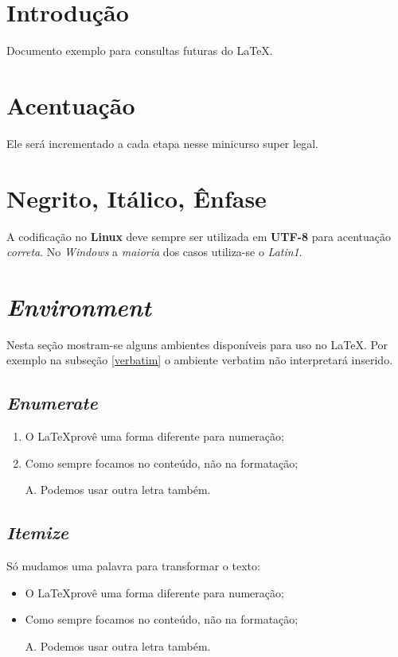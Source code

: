 \documentclass{article}
\begin{document}
	\section{Introdução}
		Documento exemplo para consultas futuras do \LaTeX.

	\section{Acentuação}		
		Ele será incrementado a cada etapa nesse minicurso super legal.
	
	\section{Negrito, Itálico, Ênfase}
		A codificação no \textbf{Linux} deve \huge sempre \normalsize ser utilizada em \textbf{UTF-8} para acentuação \emph{correta}. No \textit{Windows} a \emph{maioria} dos casos utiliza-se o \textit{Latin1}.
		
	\section{\textit{Environment}}
		Nesta seção mostram-se alguns ambientes disponíveis para uso no \LaTeX. Por exemplo na subseção \ref{verbatim} o ambiente \textsf{verbatim} não interpretará inserido.

		\subsection{\textit{Enumerate}}
			\begin{enumerate}
				\item	O \LaTeX provê uma forma diferente para numeração;
				\item	Como sempre focamos no conteúdo, não na formatação;
				\item[A.]	Podemos usar outra letra também.
			\end{enumerate}
	
		\subsection{\textit{Itemize}}
			Só mudamos uma palavra para transformar o texto:
			\begin{itemize}
				\item	O \LaTeX provê uma forma diferente para numeração;
				\item	Como sempre focamos no conteúdo, não na formatação;
				\item[A.]	Podemos usar outra letra também.
			\end{itemize}
	
\end{document}
